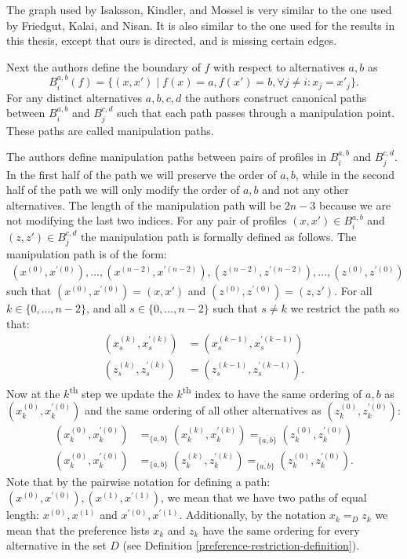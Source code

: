 	The graph used by Isaksson, Kindler, and Mossel is very similar to the one used by Friedgut, Kalai, and Nisan. It is also similar to the one used for the results in this thesis, except that ours is directed, and is missing certain edges.

	Next the authors define the boundary of $f$ with respect to alternatives $a, b$ as
	\[
		B^{a,b}_i(f) = \{(x, x') \mid f(x) = a, f(x') = b, \forall j \neq i: x_j = x'_j\}.
	\]
	For any distinct alternatives $a, b, c, d$ the authors construct canonical paths between $B^{a,b}_i$ and $B^{c,d}_j$ such that each path passes through a manipulation point. These paths are called manipulation paths.

	The authors define manipulation paths between pairs of profiles in $B^{a,b}_i$ and $B^{c,d}_j$. In the first half of the path we will preserve the order of $a, b$, while in the second half of the path we will only modify the order of $a, b$ and not any other alternatives. The length of the manipulation path will be $2n - 3$ because we are not modifying the last two indices. For any pair of profiles $(x, x') \in B^{a,b}_i$ and $(z, z') \in B^{c,d}_j$ the manipulation path is formally defined as follows. The manipulation path is of the form:
	\begin{align*}
		(x^{(0)}, x^{\prime(0)}), \ldots, (x^{(n - 2)}, x^{\prime(n - 2)}), (z^{(n - 2)}, z^{\prime(n - 2)}), \ldots, (z^{(0)}, z^{\prime(0)})
	\end{align*}
	such that $(x^{(0)}, x^{\prime(0)}) = (x, x')$ and $(z^{(0)}, z^{\prime(0)}) = (z, z')$. For all $k \in \{0, \ldots, n - 2\}$, and all $s \in \{0, \ldots, n - 2\}$ such that $s \neq k$ we restrict the path so that:
	\begin{align}
		(x_s^{(k)}, x_s^{\prime(k)}) &= (x_s^{(k-1)}, x_s^{\prime(k-1)}) \label{eq:manipulation-path-rule-1-x} \\
		(z_s^{(k)}, z_s^{\prime(k)}) &= (z_s^{(k-1)}, z_s^{\prime(k-1)}). \label{eq:manipulation-path-rule-1-z}
	\end{align}
	Now at the $k$\textsuperscript{th} step we update the $k$\textsuperscript{th} index to have the same ordering of $a, b$ as $(x_k^{(0)}, x_k^{\prime(0)})$ and the same ordering of all other alternatives as $(z_k^{(0)}, z_k^{\prime(0)})$:
	\begin{align}
		(x_k^{(0)}, x_k^{\prime(0)}) &=_{\{a, b\}} (x_k^{(k)}, x_k^{\prime(k)}) =_{\overline{\{a, b\}}} (z_k^{(0)}, z_k^{\prime(0)}) \label{eq:manipulation-path-rule-2-x} \\
		(x_k^{(0)}, x_k^{\prime(0)}) &=_{\{a, b\}} (z_k^{(k)}, z_k^{\prime(k)}) =_{\overline{\{a, b\}}} (z_k^{(0)}, z_k^{\prime(0)}). \label{eq:manipulation-path-rule-2-z}
	\end{align}
	Note that by the pairwise notation for defining a path: $(x^{(0)}, x^{\prime(0)}), (x^{(1)}, x^{\prime(1)})$, we mean that we have two paths of equal length: $x^{(0)}, x^{(1)}$ and $x^{\prime(0)}, x^{\prime(1)}$. Additionally, by the notation $x_k =_D z_k$ we mean that the preference lists $x_k$ and $z_k$ have the same ordering for every alternative in the set $D$ (see Definition \ref{preference-restriction-definition}).

